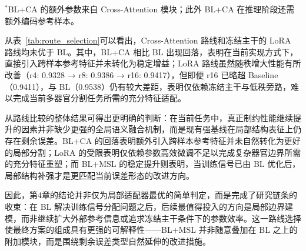 \begin{table}[htbp]
  \centering
  \caption{微调/适配路线统一比较（15 个测试病例）}
  \label{tab:route_selection}
  \small
  \vspace{2pt}
  \parbox{\textwidth}{\footnotesize $^*$BL+CA 的额外参数来自 Cross-Attention 模块；此外 BL+CA 在推理阶段还需额外编码参考样本。}
\end{table}

从表~\ref{tab:route_selection}可以看出，Cross-Attention 路线和冻结主干的 LoRA 路线均未优于 BL。其中，BL+CA 相比 BL 出现回落，表明在当前实现方式下，直接引入跨样本参考特征并未转化为稳定增益；LoRA 路线虽然随秩增大性能有所改善（r4: 0.9328 → r8: 0.9386 → r16: 0.9417），但即便 r16 已略超 Baseline（0.9411），与 BL（0.9538）仍有较大差距，表明仅依赖冻结主干与低秩旁路，难以完成当前多器官分割任务所需的充分特征适配。

从路线比较的整体结果可得出更明确的判断：在当前任务中，真正制约性能继续提升的因素并非缺少更强的全局语义融合机制，而是现有强基线在局部结构表征上仍存在剩余误差。BL+CA 的回落表明额外引入跨样本参考特征并未自然转化为更好的局部分割；LoRA 的受限表明仅依赖参数高效微调不足以完成复杂器官边界所需的充分特征重塑；而 BL+MSL 的稳定提升则表明，当训练信号已由 BL 优化后，局部结构补强才是更匹配当前误差形态的改进方向。

因此，第4章的结论并非仅为局部适配器最优的简单判定，而是完成了研究链条的收束：在 BL 解决训练信号分配问题之后，后续最值得投入的方向是局部边界建模，而非继续扩大外部参考信息或追求冻结主干条件下的参数效率。这一路线选择使最终方案的组成具有更强的可解释性——BL+MSL 并非随意叠加在 BL 之上的附加模块，而是围绕剩余误差类型自然延伸的改进措施。

